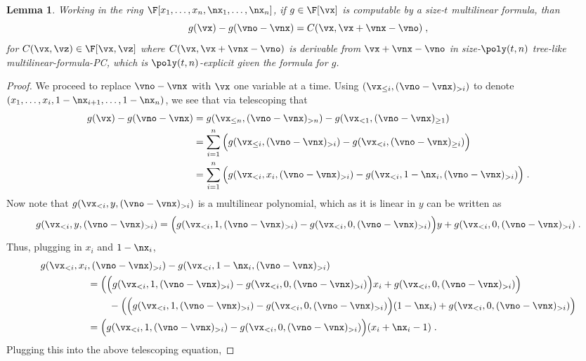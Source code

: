 \documentclass[11pt]{article}
\numberwithin{equation}{section}
\newtheorem{lemma}[theorem]{Lemma}
\theoremstyle{definition}
\theoremstyle{plain}
\begin{document}
\begin{lemma}\label{res:mult-form-PC:form-form}
        Working in the ring $\F[x_1,\ldots,x_n,\nx_1,\ldots,\nx_n]$, if $g\in\F[\vx]$ is computable by a size-$t$ multilinear formula, than
        \[
                g(\vx)-g(\vno-\vnx)=C(\vx,\vx+\vnx-\vno)
                \;,
        \]
        for $C(\vx,\vz)\in\F[\vx,\vz]$ where $C(\vx,\vx+\vnx-\vno)$ is derivable from $\vx+\vnx-\vno$ in size-$\poly(t,n)$ tree-like multilinear-formula-PC, which is $\poly(t,n)$-explicit given the formula for $g$.
\end{lemma}
\begin{proof}
        We proceed to replace $\vno-\vnx$ with $\vx$ one variable at a time.  Using $(\vx_{\le i},(\vno-\vnx)_{>i})$ to denote $(x_1,\ldots,x_i,1-\nx_{i+1},\ldots,1-\nx_{n})$, we see that via telescoping that
        \begin{align*}
                g(\vx)-g(\vno-\vnx)
                &=g(\vx_{\le n},(\vno-\vnx)_{>n})-g(\vx_{<1},(\vno-\vnx)_{\ge 1})\\
                &=\sum_{i=1}^n \Big (g(\vx_{\le i},(\vno-\vnx)_{>i}) - g(\vx_{<i},(\vno-\vnx)_{\ge i})\Big)\\
                &=\sum_{i=1}^n \Big (g(\vx_{<i},x_i,(\vno-\vnx)_{>i}) - g(\vx_{<i},1-\nx_i,(\vno-\vnx)_{> i})\Big)
                \;.
        \end{align*}
        Now note that $g(\vx_{<i},y,(\vno-\vnx)_{>i})$ is a multilinear polynomial, which as it is linear in $y$ can be written as
        \[
                g(\vx_{<i},y,(\vno-\vnx)_{>i})=\Big(g(\vx_{<i},1,(\vno-\vnx)_{>i})-g(\vx_{<i},0,(\vno-\vnx)_{>i})\Big)y+g(\vx_{<i},0,(\vno-\vnx)_{>i})
                \;.
        \]
        Thus, plugging in $x_i$ and $1-\nx_i$,
        \begin{align*}
                g(\vx_{<i},x_i&,(\vno-\vnx)_{>i})-g(\vx_{<i},1-\nx_i,(\vno-\vnx)_{>i})\\
                &=\left(\Big(g(\vx_{<i},1,(\vno-\vnx)_{>i})-g(\vx_{<i},0,(\vno-\vnx)_{>i})\Big)x_i+g(\vx_{<i},0,(\vno-\vnx)_{>i})\right)\\
                &\hspace{.3in}-\left(\Big(g(\vx_{<i},1,(\vno-\vnx)_{>i})-g(\vx_{<i},0,(\vno-\vnx)_{>i})\Big)(1-\nx_i)+g(\vx_{<i},0,(\vno-\vnx)_{>i})\right)\\
                &=\Big(g(\vx_{<i},1,(\vno-\vnx)_{>i})-g(\vx_{<i},0,(\vno-\vnx)_{>i})\Big)(x_i+\nx_i-1)
                \;.
        \end{align*}
        Plugging this into the above telescoping equation,

\end{proof}
\end{document}
